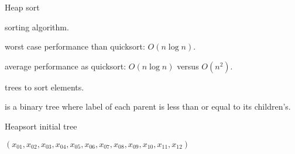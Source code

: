 \begin{frame}{Heap sort}
  \vspace{4mm}
  \begin{description}
    \setlength\itemsep{4mm}
    \item[Comparison] sorting algorithm.
    \item[Better] worst case performance than quicksort: \(O(n \log n)\).
    \item[Same] average performance as quicksort: \(O(n \log n)\) versus \(O(n^2)\).
    \item[Uses] trees to sort elements.
    \item[Heap] is a binary tree where label of each parent is less than or equal to its children's.
  \end{description}
\end{frame}

\begin{frame}[fragile]{Heapsort initial tree}
  \begin{center}
    $(x_{01},x_{02},x_{03},x_{04},x_{05},x_{06},x_{07},x_{08},x_{09},x_{10},x_{11},x_{12})$ \\[1cm]
  \end{center}
\end{frame}


